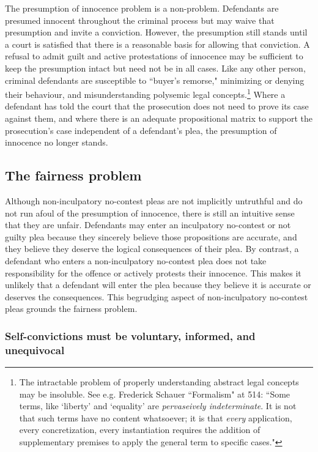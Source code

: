 The presumption of innocence problem is a non-problem. Defendants are presumed innocent throughout the criminal process but may waive that presumption and invite a conviction. However, the presumption still stands until a court is satisfied that there is a reasonable basis for allowing that conviction. A refusal to admit guilt and active protestations of innocence may be sufficient to keep the presumption intact but need not be in all cases. Like any other person, criminal defendants are susceptible to ``buyer's remorse," minimizing or denying their behaviour, and  misunderstanding polysemic legal concepts.\footnote{The intractable problem of properly understanding abstract legal concepts may be insoluble. See e.g. Frederick Schauer ``Formalism" at 514: ``Some terms, like `liberty' and `equality' are \textit{pervaseively indeterminate}. It is not that such terms have no content whatsoever; it is that \textit{every} application, every concretization, every instantiation requires the addition of supplementary premises to apply the general term to specific cases."} Where a defendant has told the court that the prosecution does not need to prove its case against them, and where there is an adequate propositional matrix to support the prosecution's case independent of a defendant's plea, the presumption of innocence no longer stands.

\subsection{The fairness problem}

Although non-inculpatory no-contest pleas are not implicitly untruthful and do not run afoul of the presumption of innocence, there is still an intuitive sense that they are unfair. Defendants may enter an inculpatory no-contest or not guilty plea because they sincerely believe those propositions are accurate, and they believe they deserve the logical consequences of their plea. By contrast, a defendant who enters a non-inculpatory no-contest plea does not take responsibility for the offence or actively protests their innocence. This makes it unlikely that a defendant will enter the plea because they believe it is accurate or deserves the consequences. This begrudging aspect of non-inculpatory no-contest pleas grounds the fairness problem. 

\subsubsection{Self-convictions must be voluntary, informed, and unequivocal}

